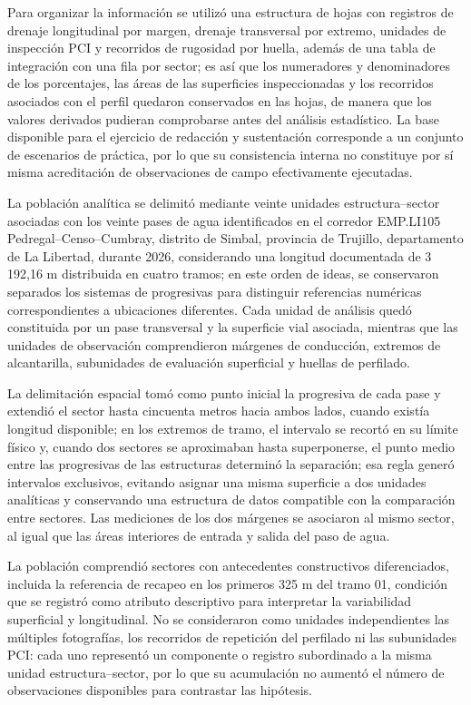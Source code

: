 Para organizar la información se utilizó una estructura de hojas con registros de drenaje longitudinal por margen, drenaje transversal por extremo, unidades de inspección PCI y recorridos de rugosidad por huella, además de una tabla de integración con una fila por sector; es así que los numeradores y denominadores de los porcentajes, las áreas de las superficies inspeccionadas y los recorridos asociados con el perfil quedaron conservados en las hojas, de manera que los valores derivados pudieran comprobarse antes del análisis estadístico. La base disponible para el ejercicio de redacción y sustentación corresponde a un conjunto de escenarios de práctica, por lo que su consistencia interna no constituye por sí misma acreditación de observaciones de campo efectivamente ejecutadas.


La población analítica se delimitó mediante veinte unidades estructura–sector asociadas con los veinte pases de agua identificados en el corredor EMP.LI105 Pedregal–Censo–Cumbray, distrito de Simbal, provincia de Trujillo, departamento de La Libertad, durante 2026, considerando una longitud documentada de 3\,192,16 m distribuida en cuatro tramos; en este orden de ideas, se conservaron separados los sistemas de progresivas para distinguir referencias numéricas correspondientes a ubicaciones diferentes. Cada unidad de análisis quedó constituida por un pase transversal y la superficie vial asociada, mientras que las unidades de observación comprendieron márgenes de conducción, extremos de alcantarilla, subunidades de evaluación superficial y huellas de perfilado.

La delimitación espacial tomó como punto inicial la progresiva de cada pase y extendió el sector hasta cincuenta metros hacia ambos lados, cuando existía longitud disponible; en los extremos de tramo, el intervalo se recortó en su límite físico y, cuando dos sectores se aproximaban hasta superponerse, el punto medio entre las progresivas de las estructuras determinó la separación; esa regla generó intervalos exclusivos, evitando asignar una misma superficie a dos unidades analíticas y conservando una estructura de datos compatible con la comparación entre sectores. Las mediciones de los dos márgenes se asociaron al mismo sector, al igual que las áreas interiores de entrada y salida del paso de agua.

La población comprendió sectores con antecedentes constructivos diferenciados, incluida la referencia de recapeo en los primeros 325 m del tramo 01, condición que se registró como atributo descriptivo para interpretar la variabilidad superficial y longitudinal. No se consideraron como unidades independientes las múltiples fotografías, los recorridos de repetición del perfilado ni las subunidades PCI: cada uno representó un componente o registro subordinado a la misma unidad estructura–sector, por lo que su acumulación no aumentó el número de observaciones disponibles para contrastar las hipótesis.

